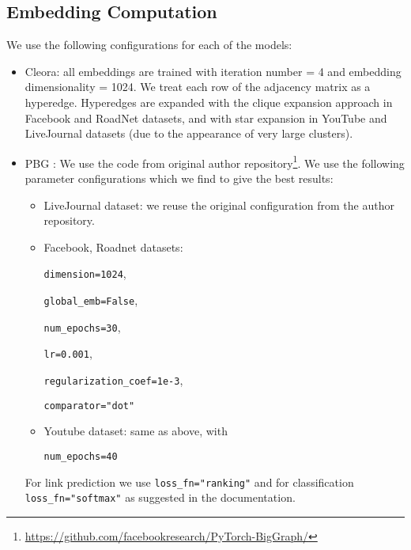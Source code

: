 \documentclass{IEEEtran}
\begin{document}
\subsection{Embedding Computation}
We use the following configurations for each of the models:
\begin{itemize}
    \item Cleora: all embeddings are trained with iteration number  = 4 and embedding dimensionality  = 1024. We treat each row of the adjacency matrix as a hyperedge. Hyperedges are expanded with the clique expansion approach in Facebook and RoadNet datasets, and with star expansion in YouTube and LiveJournal datasets (due to the appearance of very large clusters).
    \item PBG \cite{pbg}: We use the code from original author repository\footnote{\url{https://github.com/facebookresearch/PyTorch-BigGraph/}}. We use the following parameter configurations which we find to give the best results:
    \begin{itemize}
    \item LiveJournal dataset: we reuse the original configuration from the author repository. 
    
    \item Facebook, Roadnet datasets: 
    
        \texttt{dimension=1024},
    
        \texttt{global\_emb=False},
        
        \texttt{num\_epochs=30},
        
        \texttt{lr=0.001},
        
        \texttt{regularization\_coef=1e-3},
        
        \texttt{comparator="dot"}  
        
    \item Youtube dataset: same as above, with
    
    \texttt{num\_epochs=40}
    
    \end{itemize}
    For link prediction we use \texttt{loss\_fn="ranking"} and for classification \texttt{loss\_fn="softmax"} as suggested in the documentation.
    


\end{itemize}
\end{document}
